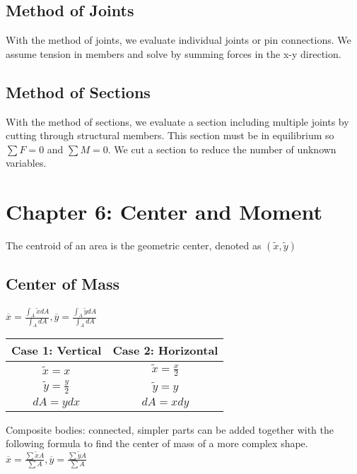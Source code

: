 \documentclass{article}
\begin{document}
    \subsection{Method of Joints}
    With the method of joints, we evaluate individual joints or pin connections. We assume tension in members and solve by summing forces in the x-y direction.

    \subsection{Method of Sections}
    With the method of sections, we evaluate a section including multiple joints by cutting through structural members. This section must be in equilibrium so $\sum F=0$ and  $\sum M=0$. 
    We cut a section to reduce the number of unknown variables.

    \newpage

    \section{Chapter 6: Center and Moment}
    The centroid of an area is the geometric center, denoted as $(\tilde{x},\tilde{y})$ 
    
    \subsection{Center of Mass}
    $\overline{x} = \frac{\int_{A} \tilde{x}dA}{\int_{A}dA}, \overline{y} = \frac{\int_{A} \tilde{y}dA}{\int_{A}dA}$
    \begin{center}
        \begin{tabular}{c|c}
            Case 1: Vertical & Case 2: Horizontal \\
            \hline 
            $\tilde{x} = x$ & $\tilde{x} = \frac{x}{2}$ \\
            $\tilde{y} = \frac{y}{2}$ & $\tilde{y} = y$ \\
            $dA = ydx$ & $dA = xdy$ \\
        \end{tabular}
    \end{center}
    Composite bodies: connected, simpler parts can be added together with the following formula to find the center of mass of a more complex shape.
    $\overline{x} = \frac{\sum \tilde{x}A}{\sum A}, \overline{y} = \frac{\sum \tilde{y}A}{\sum A}$
\end{document}

